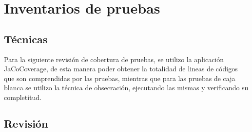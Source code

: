 \section{Inventarios de pruebas}

\subsection{Técnicas}
Para la siguiente revisión de cobertura de pruebas, se utilizo la aplicación JaCoCoverage, de esta manera poder obtener la totalidad de lineas de códigos que son comprendidas por las pruebas, mientras que para las pruebas de caja blanca se utilizo la técnica de obsecración, ejecutando las mismas y verificando su completitud.

\subsection{Revisión}

